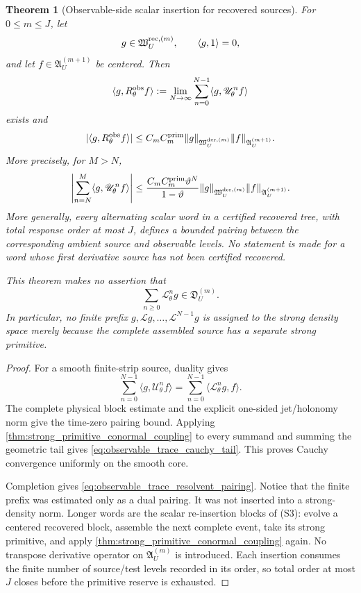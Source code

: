 \documentclass[11pt]{amsart}
\theoremstyle{compactplain}
\newtheorem{theorem}{Theorem}[section]
\theoremstyle{compactdefinition}
\theoremstyle{compactremark}
\newcommand{\Ltransfer}{\mathscr L}
\begin{document}
\begin{theorem}[Observable-side scalar insertion for recovered sources]
\label{thm:trace_insertion_recovery}
For \(0\le m\le J\), let
\[
  g\in\mathfrak W_U^{{\rm rec},(m)},\qquad
  \langle g,1\rangle=0,
\]
and let \(f\in\mathfrak A_U^{(m+1)}\) be centered.  Then
\begin{equation}
\label{eq:observable_trace_resolvent_pairing}
  \langle g,R_\theta^{\rm obs}f\rangle
  :=
  \lim_{N\to\infty}
  \sum_{n=0}^{N-1}\langle g,\mathscr U_\theta^n f\rangle
\end{equation}
exists and
\[
  |\langle g,R_\theta^{\rm obs}f\rangle|
  \le C_m C_m^{\rm prim}\|g\|_{\mathfrak W_U^{{\rm der},(m)}}
          \|f\|_{\mathfrak A_U^{(m+1)}}.
\]
More precisely, for \(M>N\),
\begin{equation}
\label{eq:observable_trace_cauchy_tail}
 \left|\sum_{n=N}^{M}
   \langle g,\mathscr U_\theta^nf\rangle\right|
 \le
 \frac{C_m C_m^{\rm prim}\vartheta^N}
      {1-\vartheta}
 \|g\|_{\mathfrak W_U^{{\rm der},(m)}}
 \|f\|_{\mathfrak A_U^{(m+1)}}.
\end{equation}
More generally, every alternating scalar word in a certified recovered tree,
with total response order at most \(J\), defines a bounded pairing between the
corresponding ambient source and observable levels.  No statement is made for a
word whose first derivative source has not been certified recovered.

This theorem makes no assertion that
\[
  \sum_{n\ge0}\Ltransfer_\theta^ng
  \in\mathfrak D_U^{(m)}.
\]
In particular, no finite prefix
\(g,\Ltransfer g,\ldots,\Ltransfer^{N-1}g\) is assigned to the strong density
space merely because the complete assembled source has a separate strong
primitive.
\end{theorem}

\begin{proof}
For a smooth finite-strip source, duality gives
\[
  \sum_{n=0}^{N-1}\langle g,\mathscr U_\theta^nf\rangle
  =
  \sum_{n=0}^{N-1}\langle\Ltransfer_\theta^ng,f\rangle .
\]
The complete physical block estimate and the explicit one-sided jet/holonomy
norm give the time-zero pairing bound.  Applying
  \cref{thm:strong_primitive_conormal_coupling} to every summand and summing the
  geometric tail gives
\eqref{eq:observable_trace_cauchy_tail}.  This proves Cauchy convergence
uniformly on the smooth core.

Completion gives \eqref{eq:observable_trace_resolvent_pairing}.  Notice that
the finite prefix was estimated only as a dual pairing.  It was not inserted
  into a strong-density norm.  Longer words are the scalar re-insertion blocks
  of (S3): evolve a centered recovered block, assemble the next complete event,
  take its strong primitive, and apply
  \cref{thm:strong_primitive_conormal_coupling} again.  No transpose derivative operator on
\(\mathfrak A_U^{(m)}\) is introduced.  Each insertion consumes the finite
number of source/test levels recorded in its order, so total order at most
\(J\) closes before the primitive reserve is exhausted.
\end{proof}
\end{document}
